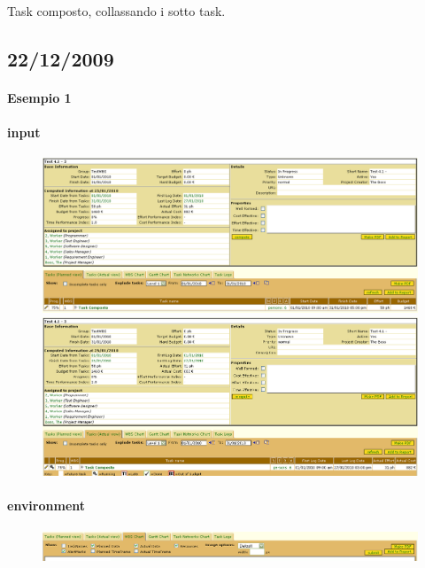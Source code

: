 Task composto, collassando i sotto task.

\subsection{22/12/2009}
\paragraph{Esempio 1}
\paragraph{input}
\begin{figure}
\centering
\includegraphics[width=\textwidth]{tests/TEST_WBS/4.1/4.1_3/Esempio_1/input.png}
\includegraphics[width=\textwidth]{tests/TEST_WBS/4.1/4.1_3/Esempio_1/input_actual.png}
\end{figure}
\paragraph{environment}
\begin{figure}
\centering
\includegraphics[width=\textwidth]{tests/TEST_WBS/4.1/4.1_3/Esempio_1/environment.png}
\end{figure}
